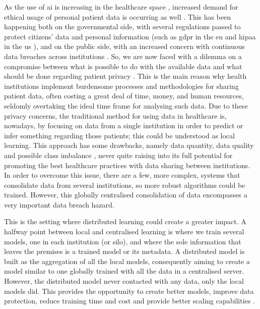 As the use of \ac{ai} is increasing in the healthcare space \cite{deep_learning_increase_health}, increased demand for ethical usage of personal patient data is occurring as well \cite{ehtical_use_ml}. This has been happening both on the governmental side, with several regulations passed to protect citizens' data and personal information (such as \ac{gdpr} in the \ac{eu} \cite{gdpr_article} and \ac{hipaa} in the \ac{us} \cite{hippa}), and on the public side, with an increased concern with continuous data breaches across institutions \cite{abdulrahmanSurveyFederatedLearning2021}. So,  we are now faced with a dilemma on a compromise between what is possible to do with the available data and what should be done regarding patient privacy \cite{swarm_learning}. This is the main reason why health institutions implement burdensome processes and methodologies for sharing patient data, often costing a great deal of time, money, and human resources, seldomly overtaking the ideal time frame for analysing such data.
Due to these privacy concerns, the traditional method for using data in healthcare is, nowadays, by focusing on data from a single institution in order to predict or infer something regarding those patients; this could be understood as local learning. This approach has some drawbacks, namely data quantity, data quality and possible class imbalance \cite{rajkomarMachineLearningMedicine2019}, never quite raising into its full potential for promoting the best healthcare practices
\cite{federated_healthcare_informatics,wangAIHealthState2019} with data sharing between institutions.
In order to overcome this issue, there are a few, more complex, systems that consolidate data from several institutions, so more robust algorithms could be trained. However, this globally centralised consolidation of data encompasses a very important data breach hazard. 

This is the setting where distributed learning could create a greater impact. A halfway point between local and centralised learning is where we train several models, one in each institution (or silo), and where the sole information that leaves the premises is a trained model or its metadata. A distributed model is built as the aggregation of all the local models, consequently aiming to create a model similar to one globally trained with all the data in a centralised server. However, the distributed model never contacted with any data, only the local models did. This provides the opportunity to create better models, improve data protection, reduce training time and cost and provide better scaling capabilities  \cite{jatainContemplativePerspectiveFederated2021}.

